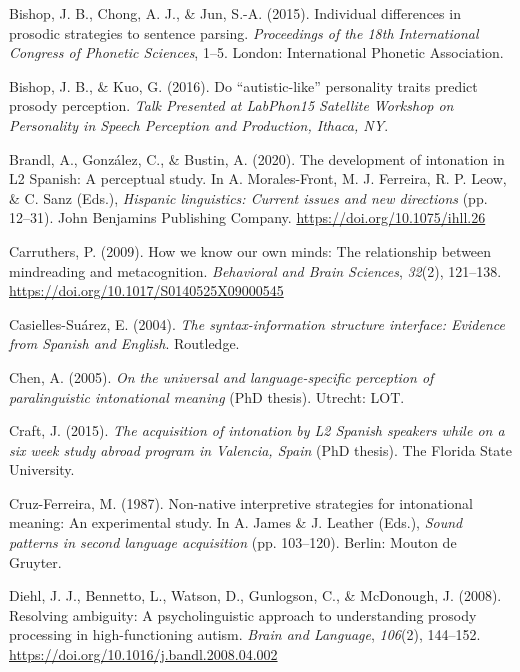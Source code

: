 \documentclass[]{article}
\newlength{\cslhangindent}
\newenvironment{CSLReferences}[2] %
 {%
  \setlength{\parindent}{0pt}
  \ifodd #1 \everypar{\setlength{\hangindent}{\cslhangindent}}\ignorespaces\fi
  \ifnum #2 > 0
  \setlength{\parskip}{#2\baselineskip}
  \fi
 }%
 {}
\begin{document}
\begin{CSLReferences}{1}{0}
\leavevmode{}%
Bishop, J. B., Chong, A. J., \& Jun, S.-A. (2015). Individual differences in prosodic strategies to sentence parsing. \emph{Proceedings of the 18th International Congress of Phonetic Sciences}, 1--5. London: International Phonetic Association.

\leavevmode{}%
Bishop, J. B., \& Kuo, G. (2016). Do {``autistic-like''} personality traits predict prosody perception. \emph{Talk Presented at LabPhon15 Satellite Workshop on Personality in Speech Perception and Production, Ithaca, NY}.

\leavevmode{}%
Brandl, A., González, C., \& Bustin, A. (2020). The development of intonation in {L}2 {S}panish: {A} perceptual study. In A. Morales-Front, M. J. Ferreira, R. P. Leow, \& C. Sanz (Eds.), \emph{Hispanic linguistics: Current issues and new directions} (pp. 12--31). John Benjamins Publishing Company. \url{https://doi.org/10.1075/ihll.26}

\leavevmode{}%
Carruthers, P. (2009). How we know our own minds: The relationship between mindreading and metacognition. \emph{Behavioral and Brain Sciences}, \emph{32}(2), 121--138. \url{https://doi.org/10.1017/S0140525X09000545}

\leavevmode{}%
Casielles-Suárez, E. (2004). \emph{The syntax-information structure interface: {E}vidence from {S}panish and {E}nglish}. Routledge.

\leavevmode{}%
Chen, A. (2005). \emph{On the universal and language-specific perception of paralinguistic intonational meaning} (PhD thesis). Utrecht: LOT.

\leavevmode{}%
Craft, J. (2015). \emph{The acquisition of intonation by {L}2 {S}panish speakers while on a six week study abroad program in {V}alencia, {S}pain} (PhD thesis). The Florida State University.

\leavevmode{}%
Cruz-Ferreira, M. (1987). Non-native interpretive strategies for intonational meaning: An experimental study. In A. James \& J. Leather (Eds.), \emph{Sound patterns in second language acquisition} (pp. 103--120). Berlin: Mouton de Gruyter.

\leavevmode{}%
Diehl, J. J., Bennetto, L., Watson, D., Gunlogson, C., \& McDonough, J. (2008). Resolving ambiguity: {A} psycholinguistic approach to understanding prosody processing in high-functioning autism. \emph{Brain and Language}, \emph{106}(2), 144--152. \url{https://doi.org/10.1016/j.bandl.2008.04.002}


\end{CSLReferences}
\end{document}

